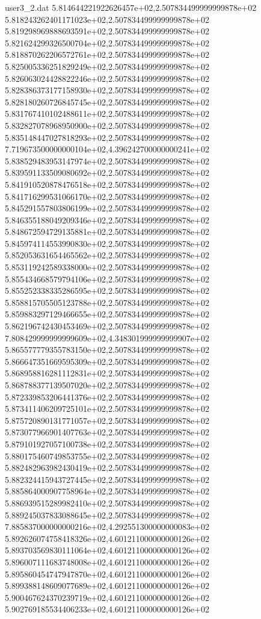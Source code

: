 \begin{filecontents}{user3_2.dat}
5.814644221922626457e+02,2.507834499999999878e+02
5.818243262401171023e+02,2.507834499999999878e+02
5.819298969888693591e+02,2.507834499999999878e+02
5.821624299326500704e+02,2.507834499999999878e+02
5.818870262206572761e+02,2.507834499999999878e+02
5.825005336251829249e+02,2.507834499999999878e+02
5.826063024428822246e+02,2.507834499999999878e+02
5.828386373177158930e+02,2.507834499999999878e+02
5.828180260726845745e+02,2.507834499999999878e+02
5.831767410102488611e+02,2.507834499999999878e+02
5.832827078968950900e+02,2.507834499999999878e+02
5.835148447027818293e+02,2.507834499999999878e+02
7.719673500000000104e+02,4.396242700000000241e+02
5.838529483953147974e+02,2.507834499999999878e+02
5.839591133509080692e+02,2.507834499999999878e+02
5.841910520878476518e+02,2.507834499999999878e+02
5.841716299531066170e+02,2.507834499999999878e+02
5.845291557803806199e+02,2.507834499999999878e+02
5.846355188049209346e+02,2.507834499999999878e+02
5.848672594729135881e+02,2.507834499999999878e+02
5.845974114553990830e+02,2.507834499999999878e+02
5.852053631654465562e+02,2.507834499999999878e+02
5.853119242589338000e+02,2.507834499999999878e+02
5.855434668579794106e+02,2.507834499999999878e+02
5.855252338335286595e+02,2.507834499999999878e+02
5.858815705505123788e+02,2.507834499999999878e+02
5.859883297129466655e+02,2.507834499999999878e+02
5.862196742430453469e+02,2.507834499999999878e+02
7.808429999999999609e+02,4.348301999999999907e+02
5.865577779355783150e+02,2.507834499999999878e+02
5.866647351669595309e+02,2.507834499999999878e+02
5.868958816281112831e+02,2.507834499999999878e+02
5.868788377139507020e+02,2.507834499999999878e+02
5.872339853206441376e+02,2.507834499999999878e+02
5.873411406209725101e+02,2.507834499999999878e+02
5.875720890131771057e+02,2.507834499999999878e+02
5.873077966901407763e+02,2.507834499999999878e+02
5.879101927057100738e+02,2.507834499999999878e+02
5.880175460749853755e+02,2.507834499999999878e+02
5.882482963982430419e+02,2.507834499999999878e+02
5.882324415943727445e+02,2.507834499999999878e+02
5.885864000907758964e+02,2.507834499999999878e+02
5.886939515289982410e+02,2.507834499999999878e+02
5.889245037833088645e+02,2.507834499999999878e+02
7.885837000000000216e+02,4.292551300000000083e+02
5.892626074758418326e+02,4.601211000000000126e+02
5.893703569830111064e+02,4.601211000000000126e+02
5.896007111683748008e+02,4.601211000000000126e+02
5.895860454747947870e+02,4.601211000000000126e+02
5.899388148609077689e+02,4.601211000000000126e+02
5.900467624370239719e+02,4.601211000000000126e+02
5.902769185534406233e+02,4.601211000000000126e+02

\end{filecontents}
